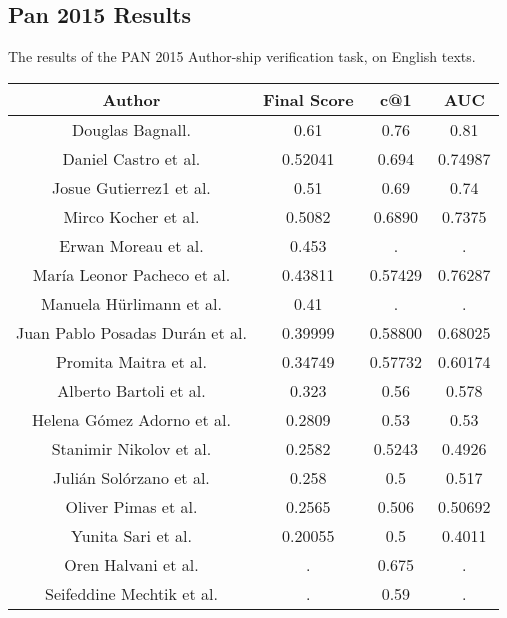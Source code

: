 \subsection{Pan 2015 Results} \label{subsec:pan2015res}
The results of the PAN 2015 Author-ship verification task, on English texts.

\begin{center}
\begin{tabular}{|c|c|c|c|}
\hline
\textbf{Author}          & \textbf{Final Score} & \textbf{c@1} & \textbf{AUC} \\ \hline
Douglas Bagnall. & 0.61 & 0.76 & 0.81 \\ \hline
Daniel Castro et al. & 0.52041 & 0.694 & 0.74987\\ \hline
Josue Gutierrez1 et al. & 0.51 & 0.69 & 0.74 \\ \hline
Mirco Kocher et al. & 0.5082 & 0.6890 & 0.7375 \\ \hline
Erwan Moreau et al. & 0.453 & . & . \\ \hline
María Leonor Pacheco et al. & 0.43811 & 0.57429 & 0.76287 \\ \hline
Manuela Hürlimann et al. & 0.41 & . & . \\ \hline
Juan Pablo Posadas Durán et al. & 0.39999 & 0.58800 & 0.68025 \\ \hline
Promita Maitra et al. & 0.34749  & 0.57732 & 0.60174 \\ \hline
Alberto Bartoli et al. & 0.323 & 0.56 & 0.578 \\ \hline
Helena Gómez Adorno et al. & 0.2809 & 0.53 & 0.53 \\ \hline
Stanimir Nikolov et al. & 0.2582 & 0.5243 & 0.4926 \\ \hline
Julián Solórzano et al. & 0.258 & 0.5 & 0.517 \\ \hline
Oliver Pimas et al. & 0.2565  & 0.506 & 0.50692 \\ \hline
Yunita Sari et al. & 0.20055 & 0.5 & 0.4011 \\ \hline
Oren Halvani et al. & . & 0.675 & . \\ \hline
Seifeddine Mechtik et al. & .  & 0.59 & . \\ \hline
\end{tabular}
\end{center}
